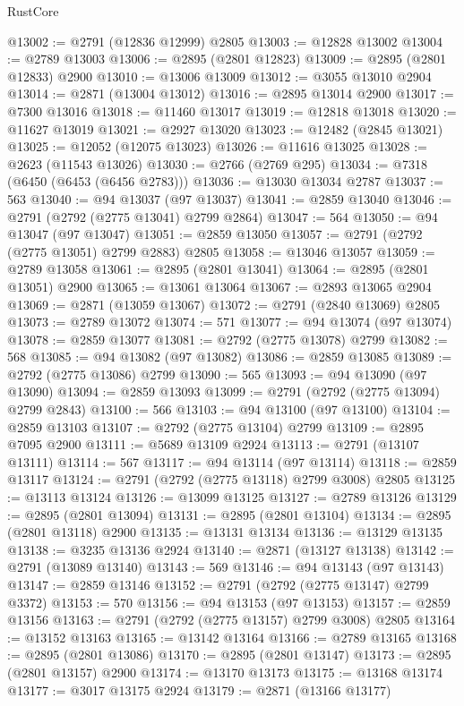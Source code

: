 \begin{lexlean}{RustCore}
\begin{coremodule}
@13002 := @2791 (@12836 @12999) @2805
@13003 := @12828 @13002
@13004 := @2789 @13003
@13006 := @2895 (@2801 @12823)
@13009 := @2895 (@2801 @12833) @2900
@13010 := @13006 @13009
@13012 := @3055 @13010 @2904
@13014 := @2871 (@13004 @13012)
@13016 := @2895 @13014 @2900
@13017 := @7300 @13016
@13018 := @11460 @13017
@13019 := @12818 @13018
@13020 := @11627 @13019
@13021 := @2927 @13020
@13023 := @12482 (@2845 @13021)
@13025 := @12052 (@12075 @13023)
@13026 := @11616 @13025
@13028 := @2623 (@11543 @13026)
@13030 := @2766 (@2769 @295)
@13034 := @7318 (@6450 (@6453 (@6456 @2783)))
@13036 := @13030 @13034 @2787
@13037 := 563
@13040 := @94 @13037 (@97 @13037)
@13041 := @2859 @13040
@13046 := @2791 (@2792 (@2775 @13041) @2799 @2864)
@13047 := 564
@13050 := @94 @13047 (@97 @13047)
@13051 := @2859 @13050
@13057 := @2791 (@2792 (@2775 @13051) @2799 @2883) @2805
@13058 := @13046 @13057
@13059 := @2789 @13058
@13061 := @2895 (@2801 @13041)
@13064 := @2895 (@2801 @13051) @2900
@13065 := @13061 @13064
@13067 := @2893 @13065 @2904
@13069 := @2871 (@13059 @13067)
@13072 := @2791 (@2840 @13069) @2805
@13073 := @2789 @13072
@13074 := 571
@13077 := @94 @13074 (@97 @13074)
@13078 := @2859 @13077
@13081 := @2792 (@2775 @13078) @2799
@13082 := 568
@13085 := @94 @13082 (@97 @13082)
@13086 := @2859 @13085
@13089 := @2792 (@2775 @13086) @2799
@13090 := 565
@13093 := @94 @13090 (@97 @13090)
@13094 := @2859 @13093
@13099 := @2791 (@2792 (@2775 @13094) @2799 @2843)
@13100 := 566
@13103 := @94 @13100 (@97 @13100)
@13104 := @2859 @13103
@13107 := @2792 (@2775 @13104) @2799
@13109 := @2895 @7095 @2900
@13111 := @5689 @13109 @2924
@13113 := @2791 (@13107 @13111)
@13114 := 567
@13117 := @94 @13114 (@97 @13114)
@13118 := @2859 @13117
@13124 := @2791 (@2792 (@2775 @13118) @2799 @3008) @2805
@13125 := @13113 @13124
@13126 := @13099 @13125
@13127 := @2789 @13126
@13129 := @2895 (@2801 @13094)
@13131 := @2895 (@2801 @13104)
@13134 := @2895 (@2801 @13118) @2900
@13135 := @13131 @13134
@13136 := @13129 @13135
@13138 := @3235 @13136 @2924
@13140 := @2871 (@13127 @13138)
@13142 := @2791 (@13089 @13140)
@13143 := 569
@13146 := @94 @13143 (@97 @13143)
@13147 := @2859 @13146
@13152 := @2791 (@2792 (@2775 @13147) @2799 @3372)
@13153 := 570
@13156 := @94 @13153 (@97 @13153)
@13157 := @2859 @13156
@13163 := @2791 (@2792 (@2775 @13157) @2799 @3008) @2805
@13164 := @13152 @13163
@13165 := @13142 @13164
@13166 := @2789 @13165
@13168 := @2895 (@2801 @13086)
@13170 := @2895 (@2801 @13147)
@13173 := @2895 (@2801 @13157) @2900
@13174 := @13170 @13173
@13175 := @13168 @13174
@13177 := @3017 @13175 @2924
@13179 := @2871 (@13166 @13177)

\end{coremodule}
\end{lexlean}
